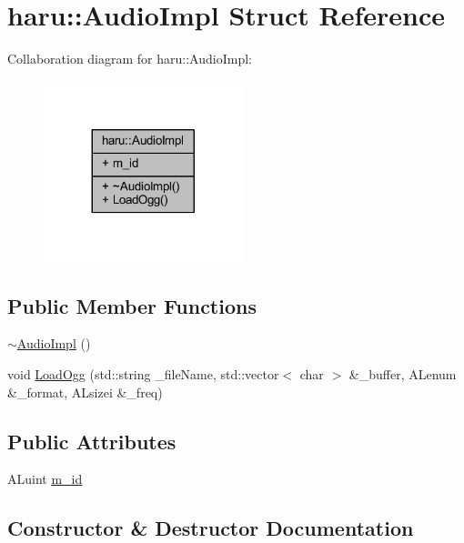 \hypertarget{structharu_1_1_audio_impl}{}\section{haru\+:\+:Audio\+Impl Struct Reference}
\label{structharu_1_1_audio_impl}


Collaboration diagram for haru\+:\+:Audio\+Impl\+:\nopagebreak
\begin{figure}[H]
\begin{center}
\leavevmode
\includegraphics[width=164pt]{structharu_1_1_audio_impl__coll__graph}
\end{center}
\end{figure}
\subsection*{Public Member Functions}
\begin{DoxyCompactItemize}
\item 
\mbox{\hyperlink{structharu_1_1_audio_impl_a0504eaf0b1151dc0c42f7b5cd5e2f19a}{$\sim$\+Audio\+Impl}} ()
\item 
void \mbox{\hyperlink{structharu_1_1_audio_impl_a1bbcc60ff37aaf0e222210b82185a370}{Load\+Ogg}} (std\+::string \+\_\+file\+Name, std\+::vector$<$ char $>$ \&\+\_\+buffer, A\+Lenum \&\+\_\+format, A\+Lsizei \&\+\_\+freq)
\end{DoxyCompactItemize}
\subsection*{Public Attributes}
\begin{DoxyCompactItemize}
\item 
A\+Luint \mbox{\hyperlink{structharu_1_1_audio_impl_ac8e1bde9361d817cc1676c309cf6541a}{m\+\_\+id}}
\end{DoxyCompactItemize}


\subsection{Constructor \& Destructor Documentation}
\mbox{\label{structharu_1_1_audio_impl_a0504eaf0b1151dc0c42f7b5cd5e2f19a}} 
